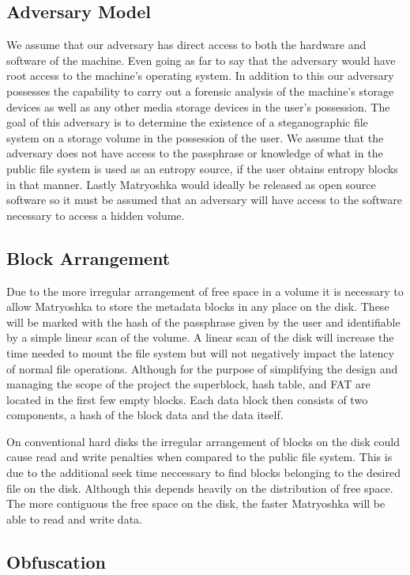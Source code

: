 \documentclass{article}
\begin{document}
\begin{multicols}{2}
\subsection{Adversary Model}
We assume that our adversary has direct access to both the hardware and software of the machine. Even going as far to say that the adversary would have root access to the machine's operating system. In addition to this our adversary possesses the capability to carry out a forensic analysis of the machine's storage devices as well as any other media storage devices in the user's possession. The goal of this adversary is to determine the existence of a steganographic file system on a storage volume in the possession of the user. We assume that the adversary does not have access to the passphrase or knowledge of what in the public file system is used as an entropy source, if the user obtains entropy blocks in that manner. Lastly Matryoshka would ideally be released as open source software so it must be assumed that an adversary will have access to the software necessary to access a hidden volume.

\subsection{Block Arrangement}
Due to the more irregular arrangement of free space in a volume it is necessary to allow Matryoshka to store the metadata blocks in any place on the disk. These will be marked with the hash of the passphrase given by the user and identifiable by a simple linear scan of the volume. A linear scan of the disk will increase the time needed to mount the file system but will not negatively impact the latency of normal file operations. Although for the purpose of simplifying the design and managing the scope of the project the superblock, hash table, and FAT are located in the first few empty blocks. Each data block then consists of two components, a hash of the block data and the data itself.

On conventional hard disks the irregular arrangement of blocks on the disk could cause read and write penalties when compared to the public file system. This is due to the additional seek time neccessary to find blocks belonging to the desired file on the disk. Although this depends heavily on the distribution of free space. The more contiguous the free space on the disk, the faster Matryoshka will be able to read and write data.

\subsection{Obfuscation}


\end{multicols}
\end{document}
